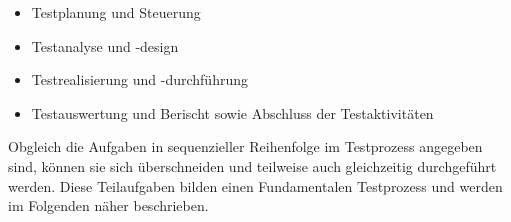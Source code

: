 \begin{itemize}
	  \itemsep0pt
      \item Testplanung und Steuerung
      \item Testanalyse und -design
      \item Testrealisierung und -durchführung
      \item Testauswertung und Berischt sowie Abschluss der Testaktivitäten       
\end{itemize}

Obgleich die Aufgaben in sequenzieller Reihenfolge im Testprozess angegeben sind, können sie sich überschneiden und teilweise auch gleichzeitig durchgeführt werden. Diese Teilaufgaben bilden einen Fundamentalen Testprozess und werden im Folgenden näher beschrieben. \cite[Seite 19]{spillner_basiswissen_2003}